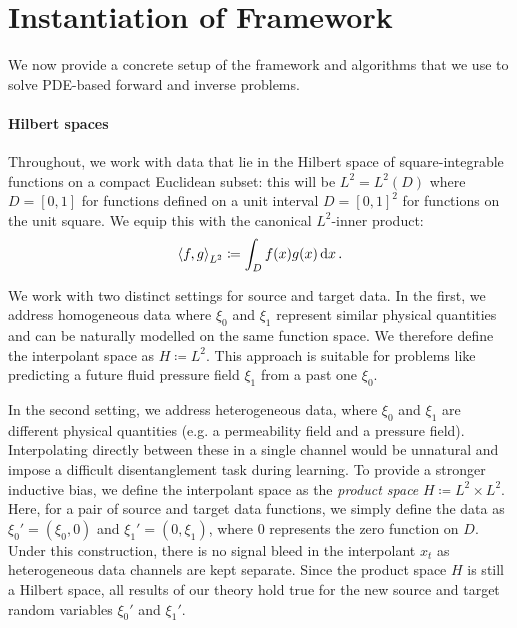\section{Instantiation of Framework}
We now provide a concrete setup of the framework and algorithms that we use to solve PDE-based forward and inverse problems.

\paragraph{Hilbert spaces} Throughout, we work with data that lie in the Hilbert space of square-integrable functions on a compact Euclidean subset: this will be \(L^{2} = L^{2}(D)\) where \(D = [0, 1]\) for functions defined on a unit interval \(D = [0, 1]^{2}\) for functions on the unit square. We equip this with the canonical \(L^{2}\)-inner product:
\[
  \ev{f, g}_{L^{2}} \coloneqq \int_{D} f(x) g(x) \dd{x}.
\]

We work with two distinct settings for source and target data. In the first, we address homogeneous data where \(\xi_{0}\) and \(\xi_{1}\) represent similar physical quantities and can be naturally modelled on the same function space. We therefore define the interpolant space as  \(H \coloneqq L^{2}\). This approach is suitable for problems like predicting a future fluid pressure field \(\xi_{1}\) from a past one \(\xi_{0}\).

In the second setting, we address heterogeneous data, where \(\xi_{0}\) and \(\xi_{1}\) are different physical quantities (e.g. a permeability field and a pressure field). Interpolating directly between these in a single channel would be unnatural and impose a difficult disentanglement task during learning. To provide a stronger inductive bias, we define the interpolant space as the \textit{product space} \(H \coloneqq L^{2} \times L^{2}\). Here, for a pair of source and target data functions, we simply define the data as \(\xi_{0}' = (\xi_{0}, 0)\) and \(\xi_{1}' = (0, \xi_{1})\), where \(0\) represents the zero function on \(D\). Under this construction,  there is no signal bleed in the interpolant \(x_{t}\)  as heterogeneous data channels are kept separate. Since the product space \(H\) is still a Hilbert space, all results of our theory hold true for the new source and target random variables \(\xi_{0}'\) and \(\xi_{1}'\).

